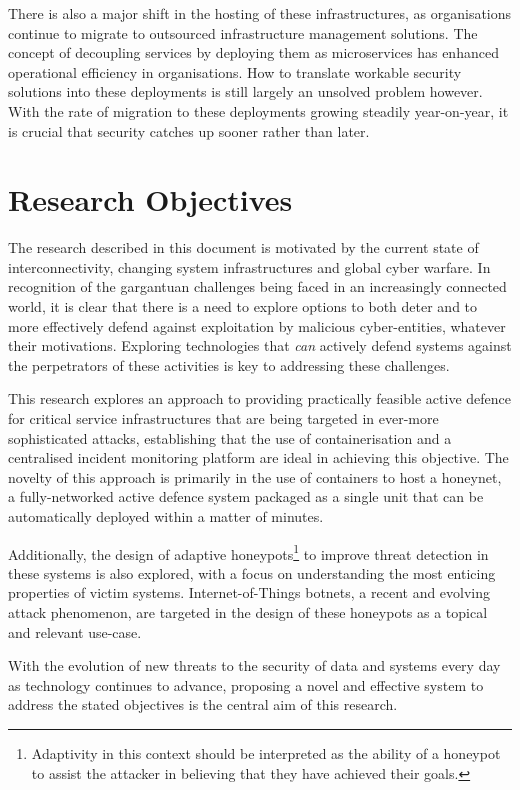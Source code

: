 There is also a major shift in the hosting of these infrastructures, as organisations continue to migrate to outsourced infrastructure management solutions. The concept of decoupling services by deploying them as microservices has enhanced operational efficiency in organisations. How to translate workable security solutions into these deployments is still largely an unsolved problem however. With the rate of migration to these deployments growing steadily year-on-year, it is crucial that security catches up sooner rather than later.

\section{Research Objectives} \label{ResearchObjectives}
The research described in this document is motivated by the current state of interconnectivity, changing system infrastructures and global cyber warfare. In recognition of the gargantuan challenges being faced in an increasingly connected world, it is clear that there is a need to explore options to both deter and to more effectively defend against exploitation by malicious cyber-entities, whatever their motivations. Exploring technologies that \textit{can} actively defend systems against the perpetrators of these activities is key to addressing these challenges.

This research explores an approach to providing practically feasible active defence for critical service infrastructures that are being targeted in ever-more sophisticated attacks, establishing that the use of containerisation and a centralised incident monitoring platform are ideal in achieving this objective. The novelty of this approach is primarily in the use of containers to host a honeynet, a fully-networked active defence system packaged as a single unit that can be automatically deployed within a matter of minutes. 

Additionally, the design of adaptive honeypots\footnote{Adaptivity in this context should be interpreted as the ability of a honeypot to assist the attacker in believing that they have achieved their goals.} to improve threat detection in these systems is also explored, with a focus on understanding the most enticing properties of victim systems. Internet-of-Things botnets, a recent and evolving attack phenomenon, are targeted in the design of these honeypots as a topical and relevant use-case.

With the evolution of new threats to the security of data and systems every day as technology continues to advance, proposing a novel and effective system to address the stated objectives is the central aim of this research.


